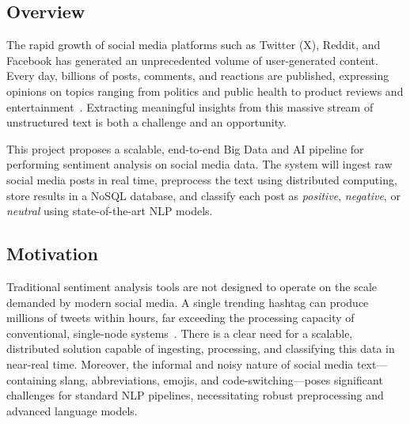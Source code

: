 \documentclass[conference]{IEEEtran}
\begin{document}
\subsection{Overview}
The rapid growth of social media platforms such as Twitter (X), Reddit, and Facebook has generated an unprecedented volume of user-generated content. Every day, billions of posts, comments, and reactions are published, expressing opinions on topics ranging from politics and public health to product reviews and entertainment~\cite{go2009twitter}. Extracting meaningful insights from this massive stream of unstructured text is both a challenge and an opportunity.

This project proposes a scalable, end-to-end Big Data and AI pipeline for performing sentiment analysis on social media data. The system will ingest raw social media posts in real time, preprocess the text using distributed computing, store results in a NoSQL database, and classify each post as \textit{positive}, \textit{negative}, or \textit{neutral} using state-of-the-art NLP models.

\subsection{Motivation}
Traditional sentiment analysis tools are not designed to operate on the scale demanded by modern social media. A single trending hashtag can produce millions of tweets within hours, far exceeding the processing capacity of conventional, single-node systems~\cite{zaharia2016apache}. There is a clear need for a scalable, distributed solution capable of ingesting, processing, and classifying this data in near-real time. Moreover, the informal and noisy nature of social media text---containing slang, abbreviations, emojis, and code-switching---poses significant challenges for standard NLP pipelines, necessitating robust preprocessing and advanced language models.
\end{document}

